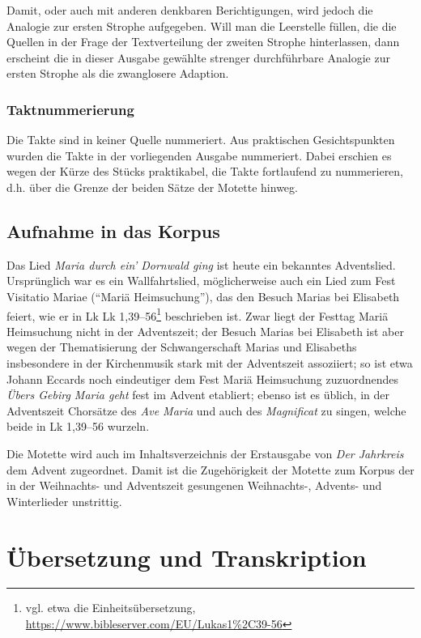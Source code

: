 \documentclass[a4paper]{book}
\begin{document}
\begin{multicols}{2}
Damit, oder auch mit anderen denkbaren Berichtigungen, wird jedoch die
Analogie zur ersten Strophe aufgegeben. Will man die Leerstelle füllen,
die die Quellen in der Frage der Textverteilung der zweiten Strophe
hinterlassen, dann erscheint die in dieser Ausgabe gewählte strenger
durchführbare Analogie zur ersten Strophe als die zwanglosere Adaption.

\subsubsection{Taktnummerierung}

Die Takte sind in keiner Quelle nummeriert. Aus praktischen
Gesichtspunkten wurden die Takte in der vorliegenden Ausgabe nummeriert.
Dabei erschien es wegen der Kürze des Stücks praktikabel, die Takte
fortlaufend zu nummerieren, d.h. über die Grenze der beiden Sätze der
Motette hinweg.

\subsection{Aufnahme in das Korpus}

Das Lied \emph{Maria durch ein' Dornwald ging} ist heute ein bekanntes Adventslied. Ursprünglich war es ein Wallfahrtslied, möglicherweise auch ein Lied zum Fest Visitatio Mariae (\enquote{Mariä Heimsuchung}), das den Besuch Marias bei Elisabeth feiert, wie er in Lk Lk 1,39–56\footnote{vgl. etwa die Einheitsübersetzung, \url{https://www.bibleserver.com/EU/Lukas1\%2C39-56} } beschrieben ist. Zwar liegt der Festtag Mariä Heimsuchung nicht in der Adventszeit; der Besuch Marias bei Elisabeth ist aber wegen der Thematisierung der Schwangerschaft Marias und Elisabeths insbesondere in der Kirchenmusik stark mit der Adventszeit assoziiert; so ist etwa Johann Eccards noch eindeutiger dem Fest Mariä Heimsuchung zuzuordnendes \emph{Übers Gebirg Maria geht} fest im Advent etabliert; ebenso ist es üblich, in der Adventszeit Chorsätze des \emph{Ave Maria} und auch des \emph{Magnificat} zu singen, welche beide in Lk 1,39–56 wurzeln.

Die Motette wird auch im Inhaltsverzeichnis der Erstausgabe von \emph{Der Jahrkreis} dem Advent zugeordnet. Damit ist die Zugehörigkeit der Motette zum Korpus der in der Weihnachts- und Adventszeit gesungenen Weihnachts-, Advents- und Winterlieder unstrittig.

\end{multicols}
\section{Übersetzung und Transkription}
\end{document}
